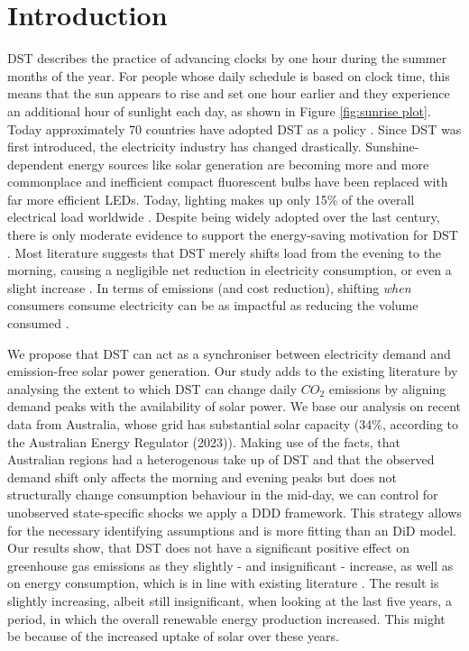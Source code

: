 
\section{Introduction}
\ac{DST} describes the practice of advancing clocks by one hour during the summer months of the year. For people whose daily schedule is based on clock time, this means that the sun appears to rise and set one hour earlier and they experience an additional hour of sunlight each day, as shown in Figure \ref{fig:sunrise plot}. Today approximately 70 countries have adopted \ac{DST} as a policy \parencite{prerau_book}. Since \ac{DST} was first introduced, the electricity industry has changed drastically. Sunshine-dependent energy sources like solar generation are becoming more and more commonplace and inefficient compact fluorescent bulbs have been replaced with far more efficient LEDs. Today, lighting makes up only 15\% of the overall electrical load worldwide \parencite{ec_lighting}. 
Despite being widely adopted over the last century, there is only moderate evidence to support the energy-saving motivation for \ac{DST} \parencite{prerau_book}. Most literature suggests that \ac{DST} merely shifts load from the evening to the morning, causing a negligible net reduction in electricity consumption, or even a slight increase \parencite{kellogg_daylight_2008, aries_effect_2008, guven}.
In terms of emissions (and cost reduction), shifting \textit{when} consumers consume electricity can be as impactful as reducing the volume consumed \parencite{holland_is_2008}.

We propose that \ac{DST} can act as a synchroniser between electricity demand and emission-free solar power generation. Our study adds to the existing literature by analysing the extent to which DST can change daily $CO_2$ emissions by aligning demand peaks with the availability of solar power. We base our analysis on recent data from Australia, whose grid has substantial solar capacity (34\%, according to the Australian Energy Regulator (2023)\nocite{state_of_the_market}). Making use of the facts, that Australian regions had a heterogenous take up of \ac{DST} and that the observed demand shift only affects the morning and evening peaks but does not structurally change consumption behaviour in the mid-day, we can control for unobserved state-specific shocks we apply a \ac{DDD} framework. This strategy allows for the necessary identifying assumptions and is more fitting than an \ac{DiD} model. Our results show, that \ac{DST} does not have a significant positive effect on greenhouse gas emissions as they slightly - and insignificant - increase, as well as on energy consumption, which is in line with existing literature \parencite{kellogg_daylight_2008}. The result is slightly increasing, albeit still insignificant, when looking at the last five years, a period, in which the overall renewable energy production increased. This might be because of the increased uptake of solar over these years.